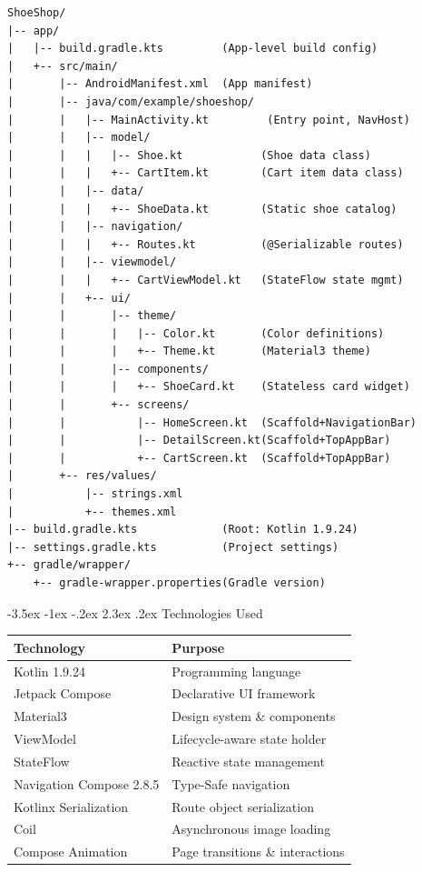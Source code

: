 \documentclass[12pt,a4paper]{article}
\makeatletter
\renewcommand\section{\@startsection{section}{1}{\z@}%
    {-3.5ex \@plus -1ex \@minus -.2ex}%
    {2.3ex \@plus.2ex}%
    {\Large\bfseries}}
\makeatother
\begin{document}
\begin{lstlisting}
ShoeShop/
|-- app/
|   |-- build.gradle.kts         (App-level build config)
|   +-- src/main/
|       |-- AndroidManifest.xml  (App manifest)
|       |-- java/com/example/shoeshop/
|       |   |-- MainActivity.kt         (Entry point, NavHost)
|       |   |-- model/
|       |   |   |-- Shoe.kt            (Shoe data class)
|       |   |   +-- CartItem.kt        (Cart item data class)
|       |   |-- data/
|       |   |   +-- ShoeData.kt        (Static shoe catalog)
|       |   |-- navigation/
|       |   |   +-- Routes.kt          (@Serializable routes)
|       |   |-- viewmodel/
|       |   |   +-- CartViewModel.kt   (StateFlow state mgmt)
|       |   +-- ui/
|       |       |-- theme/
|       |       |   |-- Color.kt       (Color definitions)
|       |       |   +-- Theme.kt       (Material3 theme)
|       |       |-- components/
|       |       |   +-- ShoeCard.kt    (Stateless card widget)
|       |       +-- screens/
|       |           |-- HomeScreen.kt  (Scaffold+NavigationBar)
|       |           |-- DetailScreen.kt(Scaffold+TopAppBar)
|       |           +-- CartScreen.kt  (Scaffold+TopAppBar)
|       +-- res/values/
|           |-- strings.xml
|           +-- themes.xml
|-- build.gradle.kts             (Root: Kotlin 1.9.24)
|-- settings.gradle.kts          (Project settings)
+-- gradle/wrapper/
    +-- gradle-wrapper.properties(Gradle version)
\end{lstlisting}

\section{Technologies Used}

\begin{table}[H]
\centering
\begin{tabular}{@{}ll@{}}
\toprule
\textbf{Technology} & \textbf{Purpose} \\
\midrule
Kotlin 1.9.24 & Programming language \\
Jetpack Compose & Declarative UI framework \\
Material3 & Design system \& components \\
ViewModel & Lifecycle-aware state holder \\
StateFlow & Reactive state management \\
Navigation Compose 2.8.5 & Type-Safe navigation \\
Kotlinx Serialization & Route object serialization \\
Coil & Asynchronous image loading \\
Compose Animation & Page transitions \& interactions \\
\bottomrule
\end{tabular}
\end{table}
\end{document}
